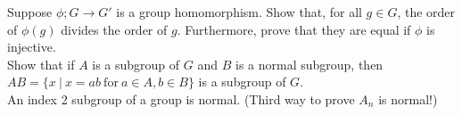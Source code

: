 \documentclass[11pt,twoside, a4paper]{report}
\theoremstyle{plain}
\theoremstyle{definition}
\begin{document}
   Suppose $\phi;G \rightarrow G'$ is a group homomorphism. 
 	Show that, for all $g \in G$, the order of $\phi(g)$ divides the order of $g$. 
 	Furthermore, prove that they are equal if $ \phi$ is injective.\\


 
  Show that if $A$ is a subgroup of $G$ and $B$ is a normal subgroup, then $AB = \{x \ | \ x =ab \ \text{for} \ a \in A, b \in B \}$ is a subgroup of $G$.\\
 
  An index 2 subgroup of a group is normal. (Third way to prove $A_n$ is normal!)\\
 
 
 
   
\end{document}
